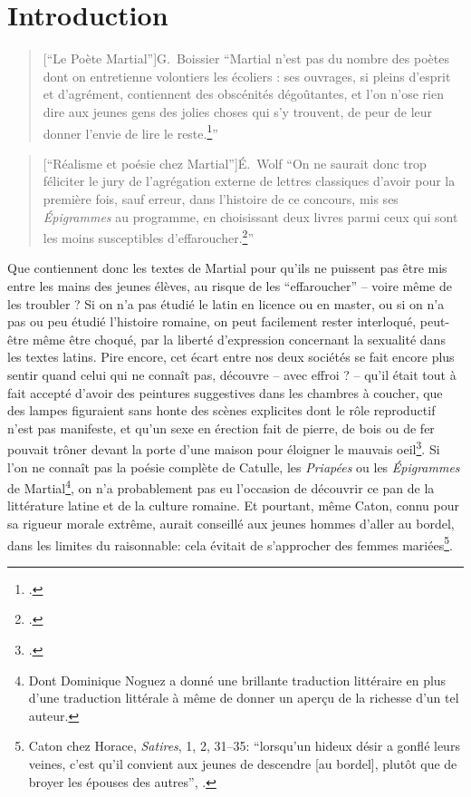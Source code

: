 \chapter*{Introduction}
\label{intro}

\begin{quote}[\enquote{Le Poète Martial}]{G.~Boissier}
    \enquote{Martial n’est pas du nombre des poètes dont on entretienne volontiers les écoliers : ses ouvrages, si pleins d’esprit et d’agrément, contiennent des obscénités dégoûtantes, et l’on n’ose rien dire aux jeunes gens des jolies choses qui s’y trouvent, de peur de leur donner l’envie de lire le reste.\footcite{boissier_poete_1900}}
\end{quote}

\begin{quote}[\enquote{Réalisme et poésie chez Martial}]{É.~Wolf}
    \enquote{On ne saurait donc trop féliciter le jury de l'agrégation externe de lettres classiques d'avoir pour la première fois, sauf erreur, dans l'histoire de ce concours, mis ses \textit{Épigrammes} au programme, en choisissant deux livres parmi ceux qui sont les moins susceptibles d'effaroucher.\footcite{wolff_realisme_1997}}
\end{quote}

Que contiennent donc les textes de Martial pour qu'ils ne puissent pas être mis entre les mains des jeunes élèves, au risque de les \enquote{effaroucher} -- voire même de les troubler ? Si on n'a pas étudié le latin en licence ou en master, ou si on n'a pas ou peu étudié l'histoire romaine, on peut facilement rester interloqué, peut-être même être choqué, par la liberté d'expression concernant la sexualité dans les textes latins. Pire encore, cet écart entre nos deux sociétés se fait encore plus sentir quand celui qui ne connaît pas, découvre -- avec effroi ? -- qu'il était tout à fait accepté d'avoir des peintures suggestives dans les chambres à coucher, que des lampes figuraient sans honte des scènes explicites dont le rôle reproductif n'est pas manifeste, et qu'un sexe en érection fait de pierre, de bois ou de fer pouvait trôner devant la porte d'une maison pour éloigner le mauvais oeil\footcite{parker_bells_2018}. Si l'on ne connaît pas la poésie complète de Catulle, les \textit{Priapées} ou les \textit{Épigrammes} de Martial\footnote{Dont Dominique Noguez a donné une brillante traduction littéraire en plus d'une traduction littérale à même de donner un aperçu de la richesse d'un tel auteur.}, on n'a probablement pas eu l'occasion de découvrir ce pan de la littérature latine et de la culture romaine. Et pourtant, même Caton, connu pour sa rigueur morale extrême, aurait conseillé aux jeunes hommes d'aller au bordel, dans les limites du raisonnable: cela évitait de s'approcher des femmes mariées\footnote{Caton chez Horace, \textit{Satires}, 1, 2, 31--35: \enquote{lorsqu'un hideux désir a gonflé leurs veines, c'est qu'il convient aux jeunes de descendre [au bordel], plutôt que de broyer les épouses des autres}, \textcite[p.~30]{puccini_delbey_vie_2010}.}.

